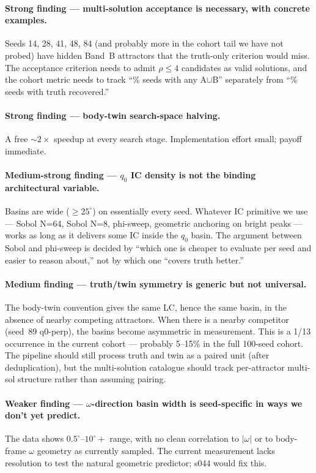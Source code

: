 \documentclass[11pt,a4paper]{article}
\begin{document}
\paragraph{Strong finding --- multi-solution acceptance is necessary, with concrete examples.} Seeds 14, 28, 41, 48, 84 (and probably more in the cohort tail we have not probed) have hidden Band~B attractors that the truth-only criterion would miss. The acceptance criterion needs to admit $\rho \leq 4$ candidates as valid solutions, and the cohort metric needs to track ``\% seeds with any A$\cup$B'' separately from ``\% seeds with truth recovered.''

\paragraph{Strong finding --- body-twin search-space halving.} A free $\sim 2\times$ speedup at every search stage. Implementation effort small; payoff immediate.

\paragraph{Medium-strong finding --- $q_0$ IC density is not the binding architectural variable.} Basins are wide ($\geq 25^\circ$) on essentially every seed. Whatever IC primitive we use --- Sobol N=64, Sobol N=8, phi-sweep, geometric anchoring on bright peaks --- works as long as it delivers some IC inside the $q_0$ basin. The argument between Sobol and phi-sweep is decided by ``which one is cheaper to evaluate per seed and easier to reason about,'' not by which one ``covers truth better.''

\paragraph{Medium finding --- truth/twin symmetry is generic but not universal.} The body-twin convention gives the same LC, hence the same basin, in the absence of nearby competing attractors. When there is a nearby competitor (seed~89 q0-perp), the basins become asymmetric in measurement. This is a 1/13 occurrence in the current cohort --- probably 5--15\% in the full 100-seed cohort. The pipeline should still process truth and twin as a paired unit (after deduplication), but the multi-solution catalogue should track per-attractor multi-sol structure rather than assuming pairing.

\paragraph{Weaker finding --- $\omega$-direction basin width is seed-specific in ways we don't yet predict.} The data shows $0.5^\circ$--$10^\circ+$ range, with no clean correlation to $|\omega|$ or to body-frame $\omega$ geometry as currently sampled. The current measurement lacks resolution to test the natural geometric predictor; s044 would fix this.
\end{document}
